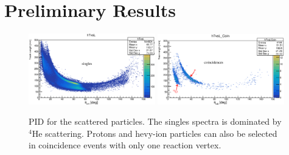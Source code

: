 \documentclass[aps,prc,onecolumn,amsmath,amssymb, preprint, 12pt]{revtex4-1}
\begin{document}
\section{Preliminary Results}





\begin{figure}[!ht]
\centering
\includegraphics[width=0.49\textwidth]{singles.eps}
\includegraphics[width=0.49\textwidth]{coin.eps}\\
 \caption{\label{pid}  PID for the scattered particles. The singles spectra is dominated by ${}^{4}$He scattering. Protons and hevy-ion particles can also be selected in coincidence events with only one reaction vertex.  }
 \end{figure}
\end{document}
